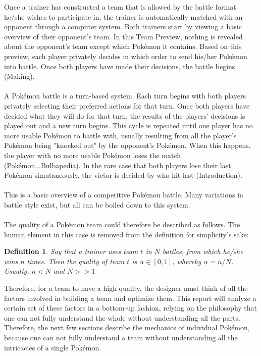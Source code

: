 \documentclass{article}
\newtheorem{definition}{Definition}
\begin{document}
Once a trainer has constructed a team that is allowed by the battle format he/she wishes to participate in, the trainer is automatically matched with an opponent through a computer system. Both trainers start by viewing a basic overview of their opponent's team. In this Team Preview, nothing is revealed about the opponent's team except which Pok\'emon it contains. Based on this preview, each player privately decides in which order to send his/her Pok\'emon into battle. Once both players have made their decisions, the battle begins (Making).\\\\
A Pok\'emon battle is a turn-based system. Each turn begins with both players privately selecting their preferred actions for that turn. Once both players have decided what they will do for that turn, the results of the players' decisions is played out and a new turn begins. This cycle is repeated until one player has no more usable Pok\'emon to battle with, usually resulting from all the player's Pok\'emon being "knocked out" by the opponent's Pok\'emon. When this happens, the player with no more usable Pok\'emon loses the match (Pok\'emon...Bulbapedia). In the rare case that both players lose their last Pok\'emon simutaneously, the victor is decided by who hit last (Introduction).\\\\
This is a basic overview of a competitive Pok\'emon battle. Many variations in battle style exist, but all can be boiled down to this system.\\\\
The quality of a Pok\'emon team could therefore be described as follows. The human element in this case is removed from the definition for simplicity's sake:
\begin{definition}\label{QualityDef}
	Say that a trainer uses team $t$ in $N$ battles, from which he/she wins $n$ times. Then the quality of team $t$ is $\alpha\in[0,1]$, whereby $\alpha=n/N$. Usually, $n<N$ and $N>>1$ 
\end{definition}
Therefore, for a team to have a high quality, the designer must think of all the factors involved in building a team and optimize them. This report will analyze a certain set of these factors in a bottom-up fashion, relying on the philosophy that one can not fully understand the whole without understanding all the parts. Therefore, the next few sections describe the mechanics of individual Pok\'emon, because one can not fully understand a team without understanding all the intricacies of a single Pok\'emon.
\end{document}
